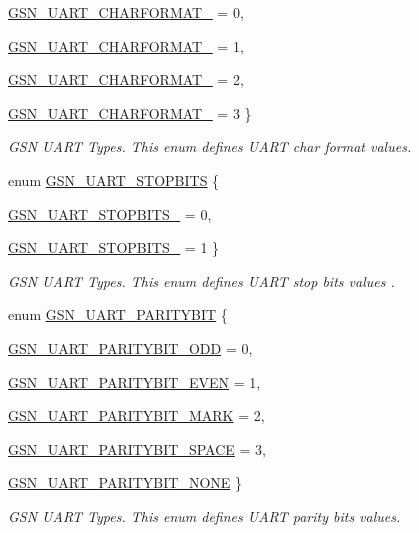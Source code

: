 \begin{DoxyCompactItemize}
\hyperlink{a00656_gga67767f968b0ccabbdd2c41c40f826e4eacbb0bb47d7c8e068379e8a4e4a1feee0}{GSN\_\-UART\_\-CHARFORMAT\_} =  0, 
\par
\hyperlink{a00656_gga67767f968b0ccabbdd2c41c40f826e4ea4b2d1e2fe97abce3f3d2eb82afab7191}{GSN\_\-UART\_\-CHARFORMAT\_} =  1, 
\par
\hyperlink{a00656_gga67767f968b0ccabbdd2c41c40f826e4ea6efc2f9b9010e5fdada35ab8d053cb61}{GSN\_\-UART\_\-CHARFORMAT\_} =  2, 
\par
\hyperlink{a00656_gga67767f968b0ccabbdd2c41c40f826e4ea79ef21d73d53e47c1b8cdeb08bb6f012}{GSN\_\-UART\_\-CHARFORMAT\_} =  3
 \}
\begin{DoxyCompactList}\small\item\em GSN UART Types. This enum defines UART char format values. \end{DoxyCompactList}\item 
enum \hyperlink{a00656_ga4871fc0b0bc6480a9cbee4d0694d23e8}{GSN\_\-UART\_\-STOPBITS} \{ \par
\hyperlink{a00656_gga4871fc0b0bc6480a9cbee4d0694d23e8adf08125e45b8fd6597ae5c9e3fdce74f}{GSN\_\-UART\_\-STOPBITS\_} =  0, 
\par
\hyperlink{a00656_gga4871fc0b0bc6480a9cbee4d0694d23e8a0e9a8f9dce89753ee946917155d2f8f7}{GSN\_\-UART\_\-STOPBITS\_} =  1
 \}
\begin{DoxyCompactList}\small\item\em GSN UART Types. This enum defines UART stop bits values . \end{DoxyCompactList}\item 
enum \hyperlink{a00656_gac5a3ad4d3d1621c5ed941f57ad0b6679}{GSN\_\-UART\_\-PARITYBIT} \{ \par
\hyperlink{a00656_ggac5a3ad4d3d1621c5ed941f57ad0b6679a8d4382c5f6da818c4586d1d9975d1469}{GSN\_\-UART\_\-PARITYBIT\_\-ODD} =  0, 
\par
\hyperlink{a00656_ggac5a3ad4d3d1621c5ed941f57ad0b6679a4f7a6be9936712e4dba380527164264b}{GSN\_\-UART\_\-PARITYBIT\_\-EVEN} =  1, 
\par
\hyperlink{a00656_ggac5a3ad4d3d1621c5ed941f57ad0b6679a8639420c9852fffc90bb61aeed1bdf37}{GSN\_\-UART\_\-PARITYBIT\_\-MARK} =  2, 
\par
\hyperlink{a00656_ggac5a3ad4d3d1621c5ed941f57ad0b6679a799adae9224500cb496c92701fc16365}{GSN\_\-UART\_\-PARITYBIT\_\-SPACE} =  3, 
\par
\hyperlink{a00656_ggac5a3ad4d3d1621c5ed941f57ad0b6679a5fd254bda102b3716865e3a9a5947a9a}{GSN\_\-UART\_\-PARITYBIT\_\-NONE}
 \}
\begin{DoxyCompactList}\small\item\em GSN UART Types. This enum defines UART parity bits values. \end{DoxyCompactList}\item 

\end{DoxyCompactItemize}
